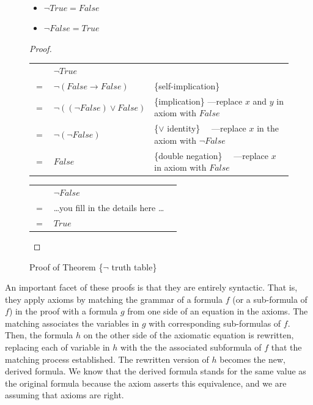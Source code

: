 \begin{figure}
\begin{theorem}
\mbox{}\\
\begin{itemize}
\item $\neg True = False$
\item $\neg False = True$
\end{itemize}
\end{theorem}
\begin{proof}
\mbox{} \\
\begin{tabular}{llp{3.15in}}
    & $\neg True$                      & \\
$=$ & $\neg (False \rightarrow False)$ & \{self-implication\} \\
$=$ & $\neg ((\neg False) \vee False)$ & \{implication\}     ---replace $x$ and $y$ in axiom with $False$ \\
$=$ & $\neg (\neg False)$              & \{$\vee$ identity\} ~~---replace $x$ in the axiom with $\neg False$ \\
$=$ & $False$                          & \{double negation\} ~~---replace $x$ in axiom with $False$ \\
\end{tabular}

\bigskip
\noindent
\begin{tabular}{lll}
    & $\neg False$                             & \\
$=$ & \dots you fill in the details here \dots & \\
$=$ & $True$                                   & \\
\end{tabular}

\end{proof}
\caption{Proof of Theorem \{$\neg$ truth table\}}
\label{fig:neg-truth-table}
\end{figure}

An important facet of these proofs is that they are
entirely syntactic. That is, they apply axioms by
matching the grammar of a formula $f$ (or a sub-formula of $f$) in the proof
with a formula $g$ from one side of an equation in the axioms.
The matching associates the variables in $g$ with corresponding sub-formulas of $f$.
Then, the formula $h$ on the other side of
the axiomatic equation is rewritten,
replacing each of variable in $h$ with the the associated subformula of $f$
that the matching process established.
The rewritten version of $h$
becomes the new, derived formula.
We know that the derived formula stands for the same value
as the original formula because the axiom asserts this equivalence,
and we are assuming that axioms are right.

